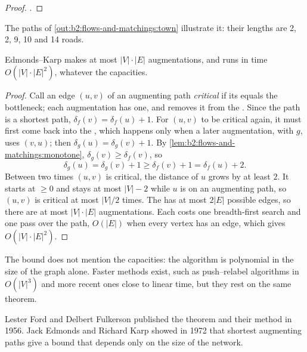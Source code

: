 \begin{proof}
.
\end{proof}

The paths of \cref{out:b2:flows-and-matchings:town} illustrate it: their lengths are 2, 2, 9, 10 and 14 roads.

\begin{theorem}\label{thm:b2:flows-and-matchings:edmonds-karp-bound}
Edmonds--Karp makes at most $|V| \cdot |E|$ augmentations, and runs in time $O(|V| \cdot |E|^2)$, whatever the
capacities.
\end{theorem}

\begin{proof}
Call an edge $(u, v)$ of an augmenting path \emph{critical} if its  equals the bottleneck; each
augmentation has one, and removes it from the . Since the path is a shortest path,
$\delta_f(v) = \delta_f(u) + 1$. For $(u, v)$ to be critical again, it must first come back into the ,
which happens only when a later augmentation, with  $g$, uses $(v, u)$; then $\delta_g(u) = \delta_g(v) + 1$. By
\cref{lem:b2:flows-and-matchings:monotone}, $\delta_g(v) \geq \delta_f(v)$, so
\[
\delta_g(u) = \delta_g(v) + 1 \geq \delta_f(v) + 1 = \delta_f(u) + 2.
\]
Between two times $(u, v)$ is critical, the distance of $u$ grows by at least $2$. It starts at $\geq 0$ and stays at
most $|V| - 2$ while $u$ is on an augmenting path, so $(u, v)$ is critical at most $|V|/2$ times. The 
has at most $2|E|$ possible edges, so there are at most $|V| \cdot |E|$ augmentations. Each costs one breadth-first search
and one pass over the path, $O(|E|)$ when every vertex has an edge, which gives $O(|V| \cdot |E|^2)$.
\end{proof}

The bound does not mention the capacities: the algorithm is polynomial in the size of the graph alone. Faster methods
exist, such as push--relabel algorithms in $O(|V|^3)$ and more recent ones close to linear time, but they rest on the
same theorem.

\begin{history}
Lester Ford and Delbert Fulkerson published the   theorem and their method in 1956. Jack Edmonds and
Richard Karp showed in 1972 that shortest augmenting paths give a bound that depends only on the size of the network.
\end{history}

